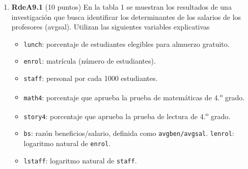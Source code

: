 \documentclass[10pt,a4paper]{article}
\begin{document}
\begin{enumerate}
 \item \textbf{RdeA9.1} (10 puntos) 
En la tabla 1  se muestran los resultados de una investigación que busca identificar los determinantes de los salarios de los profesores (avgsal).  Utilizan las siguientes variables explicativas 

\begin{itemize}
   \item \texttt{lunch}: porcentaje de estudiantes elegibles para almuerzo gratuito.
  \item \texttt{enrol}: matrícula (número de estudiantes).
  \item \texttt{staff}: personal por cada 1000 estudiantes.
 
  \item \texttt{math4}: porcentaje que aprueba la prueba de matemáticas de 4.\textsuperscript{o} grado.
  \item \texttt{story4}: porcentaje que aprueba la prueba de lectura de 4.\textsuperscript{o} grado.
  \item \texttt{bs}: razón beneficios/salario, definida como \texttt{avgben/avgsal}.
 \texttt{lenrol}: logaritmo natural de \texttt{enrol}.
  \item \texttt{lstaff}: logaritmo natural de \texttt{staff}.
\end{itemize}

\begin{table}[!htbp] \centering 
  \caption{Tabla 1:Salarios de los profesores}  \label{tabla_reg}%


\end{table}
\end{enumerate}
\end{document}
